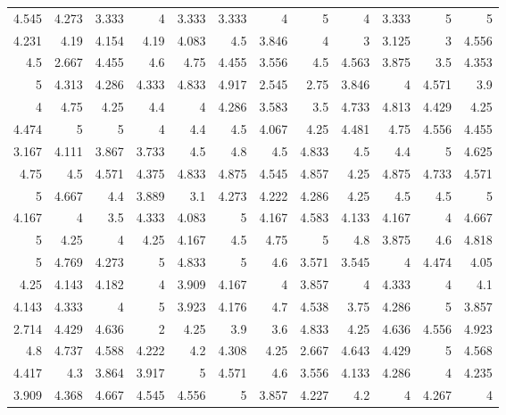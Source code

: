 \documentclass[10pt]{report}
\begin{document}
\begin{table}
    \centering

	\begin{tabular}{rrrrrrrrrrrr}
	\hline
	4.545 & 4.273 & 3.333 & 4     & 3.333 & 3.333 & 4     & 5     & 4     & 3.333 & 5     & 5     \\
	4.231 & 4.19  & 4.154 & 4.19  & 4.083 & 4.5   & 3.846 & 4     & 3     & 3.125 & 3     & 4.556 \\
	4.5   & 2.667 & 4.455 & 4.6   & 4.75  & 4.455 & 3.556 & 4.5   & 4.563 & 3.875 & 3.5   & 4.353 \\
	5     & 4.313 & 4.286 & 4.333 & 4.833 & 4.917 & 2.545 & 2.75  & 3.846 & 4     & 4.571 & 3.9   \\
	4     & 4.75  & 4.25  & 4.4   & 4     & 4.286 & 3.583 & 3.5   & 4.733 & 4.813 & 4.429 & 4.25  \\
	4.474 & 5     & 5     & 4     & 4.4   & 4.5   & 4.067 & 4.25  & 4.481 & 4.75  & 4.556 & 4.455 \\
	3.167 & 4.111 & 3.867 & 3.733 & 4.5   & 4.8   & 4.5   & 4.833 & 4.5   & 4.4   & 5     & 4.625 \\
	4.75  & 4.5   & 4.571 & 4.375 & 4.833 & 4.875 & 4.545 & 4.857 & 4.25  & 4.875 & 4.733 & 4.571 \\
	5     & 4.667 & 4.4   & 3.889 & 3.1   & 4.273 & 4.222 & 4.286 & 4.25  & 4.5   & 4.5   & 5     \\
	4.167 & 4     & 3.5   & 4.333 & 4.083 & 5     & 4.167 & 4.583 & 4.133 & 4.167 & 4     & 4.667 \\
	5     & 4.25  & 4     & 4.25  & 4.167 & 4.5   & 4.75  & 5     & 4.8   & 3.875 & 4.6   & 4.818 \\
	5     & 4.769 & 4.273 & 5     & 4.833 & 5     & 4.6   & 3.571 & 3.545 & 4     & 4.474 & 4.05  \\
	4.25  & 4.143 & 4.182 & 4     & 3.909 & 4.167 & 4     & 3.857 & 4     & 4.333 & 4     & 4.1   \\
	4.143 & 4.333 & 4     & 5     & 3.923 & 4.176 & 4.7   & 4.538 & 3.75  & 4.286 & 5     & 3.857 \\
	2.714 & 4.429 & 4.636 & 2     & 4.25  & 3.9   & 3.6   & 4.833 & 4.25  & 4.636 & 4.556 & 4.923 \\
	4.8   & 4.737 & 4.588 & 4.222 & 4.2   & 4.308 & 4.25  & 2.667 & 4.643 & 4.429 & 5     & 4.568 \\
	4.417 & 4.3   & 3.864 & 3.917 & 5     & 4.571 & 4.6   & 3.556 & 4.133 & 4.286 & 4     & 4.235 \\
	3.909 & 4.368 & 4.667 & 4.545 & 4.556 & 5     & 3.857 & 4.227 & 4.2   & 4     & 4.267 & 4     \\

\end{tabular}
\end{table}
\end{document}
